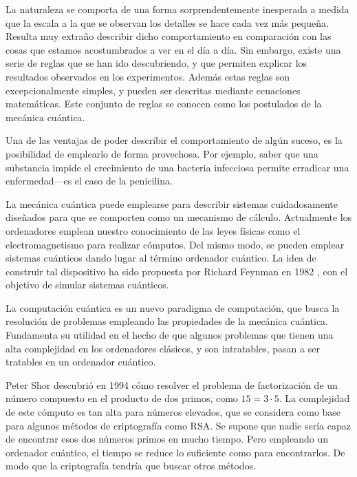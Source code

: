 


La naturaleza se comporta de una forma sorprendentemente inesperada a medida que 
la escala a la que se observan los detalles se hace cada vez más pequeña.  
Resulta muy extraño describir dicho comportamiento en comparación con las cosas 
que estamos acostumbrados a ver en el día a día. Sin embargo, existe una serie 
de reglas que se han ido descubriendo, y que permiten explicar los resultados 
observados en los experimentos. Además estas reglas son excepcionalmente 
simples, y pueden ser descritas mediante ecuaciones matemáticas. Este conjunto 
de reglas se conocen como los postulados de la mecánica cuántica.

Una de las ventajas de poder describir el comportamiento de algún suceso, es la 
posibilidad de emplearlo de forma provechosa. Por ejemplo, saber que una 
substancia impide el crecimiento de una bacteria infecciosa permite erradicar 
una enfermedad---es el caso de la penicilina.

La mecánica cuántica puede emplearse para describir sistemas cuidadosamente 
diseñados para que se comporten como un mecanismo de cálculo. Actualmente los 
ordenadores emplean nuestro conocimiento de las leyes físicas como el 
electromagnetismo para realizar cómputos. Del mismo modo, se pueden emplear 
sistemas cuánticos dando lugar al término ordenador cuántico. La idea de 
construir tal dispositivo ha sido propuesta por Richard Feynman en 1982 
\cite{feynman-sim}, con el objetivo de simular sistemas cuánticos.

La computación cuántica es un nuevo paradigma de computación, que busca la
resolución de problemas empleando las propiedades de la mecánica cuántica.
Fundamenta su utilidad en el hecho de que algunos problemas que tienen una alta
complejidad en los ordenadores clásicos, y son intratables, pasan a ser
tratables en un ordenador cuántico.

Peter Shor descubrió en 1994 \cite{shor97} cómo resolver el problema de 
factorización de un número compuesto en el producto de dos primos, como $15 = 
3\cdot5$. La complejidad de este cómputo es tan alta para números elevados, que 
se considera como base para algunos métodos de criptografía como RSA. Se supone 
que nadie sería capaz de encontrar esos dos números primos en mucho tiempo. Pero 
empleando un ordenador cuántico, el tiempo se reduce lo suficiente como para 
encontrarlos. De modo que la criptografía tendría que buscar otros métodos.

